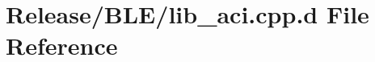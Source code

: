 \hypertarget{_release_2_b_l_e_2lib__aci_8cpp_8d}{\section{\-Release/\-B\-L\-E/lib\-\_\-aci.cpp.\-d \-File \-Reference}
\label{_release_2_b_l_e_2lib__aci_8cpp_8d}
}
